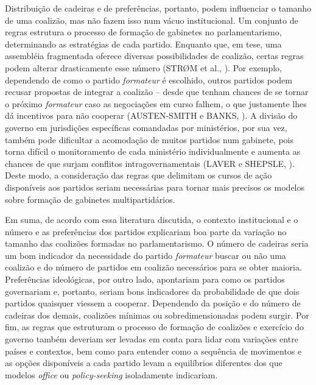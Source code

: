 Distribuição de cadeiras e de preferências, portanto, podem influenciar o tamanho de uma coalizão, mas não fazem isso num vácuo institucional. Um conjunto de regras estrutura o processo de formação de gabinetes no parlamentarismo, determinando as estratégias de cada partido. Enquanto que, em tese, uma assembléia fragmentada oferece diversas possibilidades de coalizão, certas regras podem alterar drasticamente esse número (STR\O{}M et al., \citeyear{strom1994}). Por exemplo, dependendo de como o partido \textit{formateur} é escolhido, outros partidos podem recusar propostas de integrar a coalizão -- desde que tenham chances de se tornar o próximo \textit{formateur} caso as negociações em curso falhem, o que justamente lhes dá incentivos para não cooperar (AUSTEN-SMITH e BANKS, \citeyear{austen1988}). A divisão do governo em jurisdições específicas comandadas por ministérios, por sua vez, também pode dificultar a acomodação de muitos partidos num gabinete, pois torna difícil o monitoramento de cada ministério individualmente e aumenta as chances de que surjam conflitos intragovernamentais (LAVER e SHEPSLE, \citeyear{laver1996}). Deste modo, a consideração das regras que delimitam os cursos de ação disponíveis aos partidos seriam necessárias para tornar mais precisos os modelos sobre formação de gabinetes multipartidários.

Em suma, de acordo com essa literatura discutida, o contexto institucional e o número e as preferências dos partidos explicariam boa parte da variação no tamanho das coalizões formadas no parlamentarismo. O número de cadeiras seria um bom indicador da necessidade do partido \textit{formateur} buscar ou não uma coalizão e do número de partidos em coalizão necessários para se obter maioria. Preferências ideológicas, por outro lado, apontariam para como os partidos governariam e, portanto, seriam bons indicadores da probabilidade de que dois partidos quaisquer viessem a cooperar. Dependendo da posição e do número de cadeiras dos demais, coalizões mínimas ou sobredimensionadas podem surgir. Por fim, as regras que estruturam o processo de formação de coalizões e exercício do governo também deveriam ser levadas em conta para lidar com variações entre países e contextos, bem como para entender como a sequência de movimentos e as opções disponíveis a cada partido levam a equilíbrios diferentes dos que modelos \textit{office} ou \textit{policy-seeking} isoladamente indicariam. 
